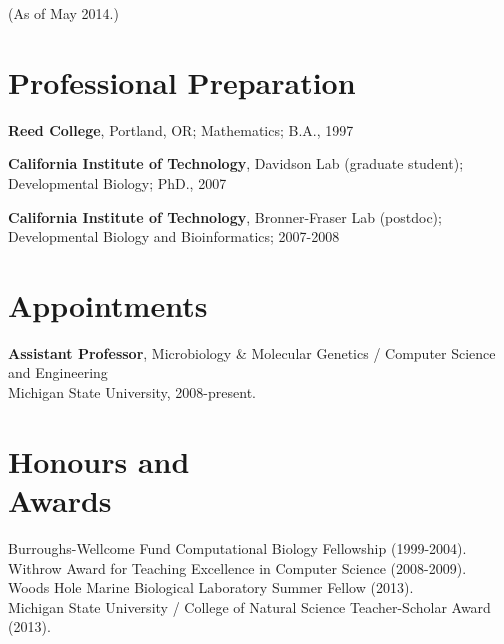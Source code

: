 \documentclass[margin,line]{resume}
\begin{document}
\pagestyle{plain}


\begin{resume}



    {\small (As of May 2014.)}

    \section{\mysidestyle Professional Preparation}

    {\bf Reed College}, Portland, OR; Mathematics; B.A., 1997

    \vspace{2mm}

    {\bf California Institute of Technology}, Davidson Lab (graduate student);
\\
Developmental Biology; PhD., 2007

    \vspace{2mm}

    {\bf California Institute of Technology}, Bronner-Fraser Lab (postdoc);\\
 Developmental Biology and Bioinformatics; 2007-2008

    \vspace{2mm}

    \section{\mysidestyle Appointments}

    {\bf Assistant Professor}, 
Microbiology \& Molecular Genetics / Computer Science and Engineering\\
Michigan State University, 2008-present.

    \section{\mysidestyle Honours and\\Awards} 

Burroughs-Wellcome Fund Computational Biology Fellowship (1999-2004).\\
Withrow Award for Teaching Excellence in Computer Science (2008-2009). \\
Woods Hole Marine Biological Laboratory Summer Fellow (2013).\\
Michigan State University / College of Natural Science Teacher-Scholar Award (2013).



\end{resume}
\end{document}
